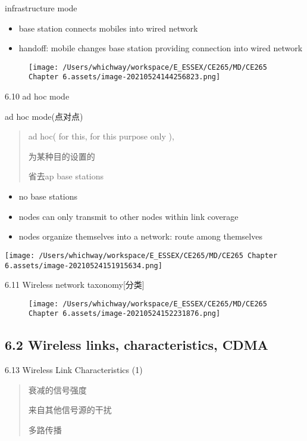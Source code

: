 \documentclass[
]{article}
\begin{document}
infrastructure mode

\begin{itemize}
\item
  base station connects mobiles into wired network
\item
  handoff: mobile changes base station providing connection into wired
  network
\end{itemize}

\begin{figure}
\centering
\texttt{[image: /Users/whichway/workspace/E\_ESSEX/CE265/MD/CE265 Chapter 6.assets/image-20210524144256823.png]}
\caption{}
\end{figure}

6.10 ad hoc mode

ad hoc mode(点对点)

\begin{quote}
ad hoc( for this, for this purpose only ),

为某种目的设置的

省去ap base stations
\end{quote}

\begin{itemize}
\item
  no base stations
\item
  nodes can only transmit to other nodes within link coverage
\item
  nodes organize themselves into a network: route among themselves
\end{itemize}

\texttt{[image: /Users/whichway/workspace/E\_ESSEX/CE265/MD/CE265 Chapter 6.assets/image-20210524151915634.png]}

6.11 Wireless network taxonomy{[}分类{]}

\begin{figure}
\centering
\texttt{[image: /Users/whichway/workspace/E\_ESSEX/CE265/MD/CE265 Chapter 6.assets/image-20210524152231876.png]}
\caption{}
\end{figure}

\hypertarget{62-wireless-links-characteristics--cdma}{%
\subsection{6.2 Wireless links, characteristics,
CDMA}\label{62-wireless-links-characteristics--cdma}}

6.13 Wireless Link Characteristics (1)

\begin{quote}
衰减的信号强度

来自其他信号源的干扰

多路传播📣
\end{quote}
\end{document}
